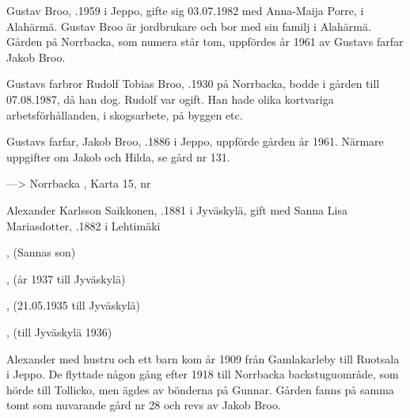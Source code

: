 
Gustav Broo,  .1959 i Jeppo, gifte sig 03.07.1982 med Anna-Maija Porre,  i Alahärmä. Gustav Broo är jordbrukare och bor med sin familj i Alahärmä. Gården på Norrbacka, som numera står tom, uppfördes år 1961 av Gustavs farfar Jakob Broo.
\begin{jhchildren}
  \item {}
  \item {}
  \item {}
  \item {}
\end{jhchildren}


Gustavs farbror Rudolf Tobias Broo, .1930 på Norrbacka, bodde i gården till 07.08.1987, då han dog. Rudolf var ogift. Han hade olika kortvariga arbetsförhållanden, i skogsarbete, på byggen etc.


Gustavs farfar, Jakob Broo, .1886 i Jeppo, uppförde gården år 1961. Närmare uppgifter om Jakob och Hilda, se gård nr 131.


---> Norrbacka  , Karta 15, nr 


Alexander Karlsson Saikkonen, .1881 i Jyväskylä, gift med Sanna Lisa Mariasdotter, .1882 i Lehtimäki
\begin{jhchildren}
  \item {}, (Sannas son)
  \item {}
  \item {}, (år 1937 till Jyväskylä)
  \item {}
  \item {}
  \item {}, (21.05.1935 till Jyväskylä)
  \item {}, (till Jyväskylä 1936)
\end{jhchildren}
Alexander med hustru och ett barn kom år 1909 från Gamlakarleby till Ruotsala i Jeppo. De flyttade någon gång efter 1918 till Norrbacka backstuguområde, som hörde till Tollicko, men ägdes av bönderna på Gunnar. Gården fanns på samma tomt som nuvarande gård nr 28 och revs av Jakob Broo.

